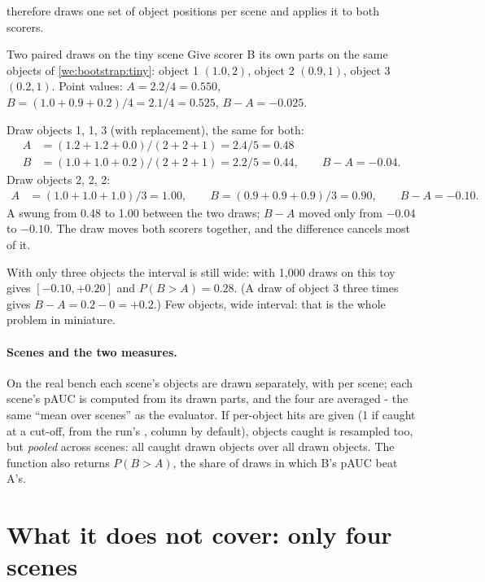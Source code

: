  therefore draws one set of object positions per scene and applies it to both scorers.

\begin{worked}[label={we:bootstrap:draws}]{Two paired draws on the tiny scene}
Give scorer B its own parts on the same objects of \cref{we:bootstrap:tiny}: object 1 $(1.0, 2)$, object 2 $(0.9, 1)$,
object 3 $(0.2, 1)$. Point values: $A = 2.2/4 = 0.550$, $B = (1.0 + 0.9 + 0.2)/4 = 2.1/4 = 0.525$, $B - A = -0.025$.

Draw objects 1, 1, 3 (with replacement), the same for both:
\begin{align*}
A &= (1.2 + 1.2 + 0.0)/(2 + 2 + 1) = 2.4/5 = 0.48\\
B &= (1.0 + 1.0 + 0.2)/(2 + 2 + 1) = 2.2/5 = 0.44, \qquad B - A = -0.04.
\end{align*}
Draw objects 2, 2, 2:
\begin{align*}
A &= (1.0 + 1.0 + 1.0)/3 = 1.00, \qquad B = (0.9 + 0.9 + 0.9)/3 = 0.90, \qquad B - A = -0.10.
\end{align*}
A swung from 0.48 to 1.00 between the two draws; $B - A$ moved only from $-0.04$ to $-0.10$. The draw moves both scorers
together, and the difference cancels most of it.

With only three objects the interval is still wide:  with 1,000 draws on this toy gives
$[-0.10, +0.20]$ and $P(B > A) = 0.28$\tagC{}. (A draw of object 3 three times gives $B - A = 0.2 - 0 = +0.2$.) Few
objects, wide interval: that is the whole problem in miniature.
\end{worked}

\paragraph{Scenes and the two measures.} On the real bench each scene's objects are drawn separately, with
 per scene; each scene's pAUC is computed from its drawn parts, and
the four are averaged - the same ``mean over scenes'' as the evaluator. If per-object hits are given (1 if caught at a
cut-off, from the run's , column  by default), objects caught is resampled too, but
\emph{pooled} across scenes: all caught drawn objects over all drawn objects. The function also returns
$P(B > A)$, the share of draws in which B's pAUC beat A's.

\section{What it does not cover: only four scenes}\label{sec:bootstrap:scenes}


